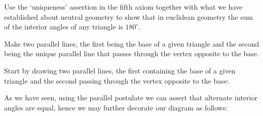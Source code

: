 \documentclass[newpage,hints,handout,noauthor,nooutcomes,12pt]{ximera}
\begin{document}
\begin{problem}
Use the `uniqueness' assertion in the fifth axiom together with what
we have established about neutral geometry to show that in euclidean geometry
the sum of the interior angles of any triangle is $180^\circ$.

\begin{hint}
Make two parallel lines, the first being the base of a given triangle
and the second being the unique parallel line that passes through the
vertex opposite to the base.
\end{hint}
\begin{freeResponse}
Start by drawing two parallel lines, the first containing the base of a
given triangle and the second passing through the vertex opposite to
the base:
\begin{image}
\end{image}
As we have seen, using the parallel postulate we can assert that
alternate interior angles are equal, hence we may further decorate our
diagram as follows:
\begin{image}
\end{image}
\end{freeResponse}
\end{problem}
\end{document}
